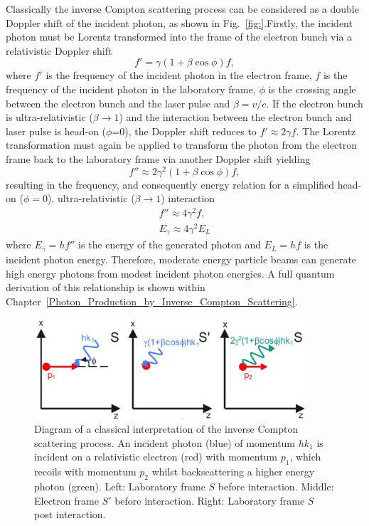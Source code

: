 \documentclass[../main.tex]{subfiles}
\begin{document}
Classically the inverse Compton scattering process can be considered as a double Doppler shift of the incident photon, as shown in Fig.~\ref{fig:}.Firstly, the incident photon must be Lorentz transformed into the frame of the electron bunch via a relativistic Doppler shift
\begin{equation}
f'=\gamma\left(1+\beta\cos\phi\right)f,
\label{eq:Doppler_shift}    
\end{equation}
where $f'$ is the frequency of the incident photon in the electron frame, $f$ is the frequency of the incident photon in the laboratory frame, $\phi$ is the crossing angle between the electron bunch and the laser pulse and $\beta = v/c$. If the electron bunch is ultra-relativistic ($\beta\rightarrow 1$) and the interaction between the electron bunch and laser pulse is head-on ($\phi$=0), the Doppler shift reduces to $f'\approx2\gamma f$. The Lorentz transformation must again be applied to transform the photon from the electron frame back to the laboratory frame via another Doppler shift yielding  
\begin{equation}
f'' \approx 2\gamma^{2}\left(1+\beta\cos\phi\right)f, 
\label{eq:2nd_Doppler_shift}    
\end{equation}
resulting in the frequency, and consequently energy relation for a simplified head-on ($\phi=0$), ultra-relativistic ($\beta\rightarrow 1$) interaction 
\begin{align}
f'' \approx 4\gamma^{2}f, \nonumber \\
E_{\gamma} \approx 4\gamma^{2}E_{L}
\end{align}
where $E_{\gamma} = hf''$ is the energy of the generated photon and $E_{L} = hf$ is the incident photon energy. Therefore, moderate energy particle beams can generate high energy photons from modest incident photon energies. A full quantum derivation of this relationship is shown within Chapter~\ref{Photon_Production_by_Inverse_Compton_Scattering}. 

\begin{figure}[!h]
\centering
\includegraphics[width=0.9\textwidth]{Figures/Introduction/Classic_ICS_fin.pdf}
\caption{Diagram of a classical interpretation of the inverse Compton scattering process. An incident photon (blue) of momentum $hk_{1}$ is incident on a relativistic electron (red) with momentum $p_{1}$, which recoils with momentum $p_{2}$ whilst backscattering a higher energy photon (green). Left: Laboratory frame $S$ before interaction. Middle: Electron frame $S'$ before interaction. Right: Laboratory frame $S$ post interaction.}
\label{fig:classical_ICS_diagram}
\end{figure}
\end{document}
